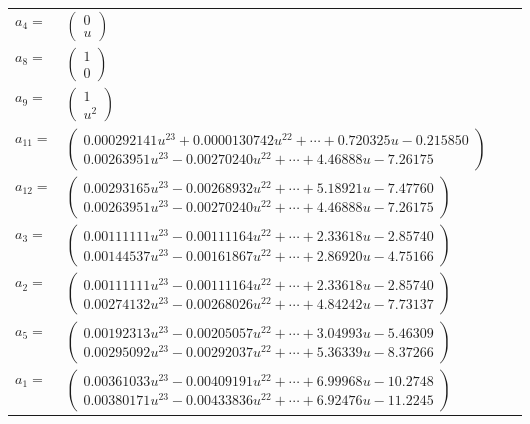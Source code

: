 \documentclass[1p]{elsarticle_modified}
\theoremstyle{definition}
\begin{document}
\begin{tabular}{m{7pt} m{180pt} m{7pt} m{180pt} }
\flushright $a_{4}=$&$\begin{pmatrix}0\\u\end{pmatrix}$ \\
\flushright $a_{8}=$&$\begin{pmatrix}1\\0\end{pmatrix}$ \\
\flushright $a_{9}=$&$\begin{pmatrix}1\\u^2\end{pmatrix}$ \\
\flushright $a_{11}=$&$\begin{pmatrix}0.000292141 u^{23}+0.0000130742 u^{22}+\cdots+0.720325 u-0.215850\\0.00263951 u^{23}-0.00270240 u^{22}+\cdots+4.46888 u-7.26175\end{pmatrix}$ \\
\flushright $a_{12}=$&$\begin{pmatrix}0.00293165 u^{23}-0.00268932 u^{22}+\cdots+5.18921 u-7.47760\\0.00263951 u^{23}-0.00270240 u^{22}+\cdots+4.46888 u-7.26175\end{pmatrix}$ \\
\flushright $a_{3}=$&$\begin{pmatrix}0.00111111 u^{23}-0.00111164 u^{22}+\cdots+2.33618 u-2.85740\\0.00144537 u^{23}-0.00161867 u^{22}+\cdots+2.86920 u-4.75166\end{pmatrix}$ \\
\flushright $a_{2}=$&$\begin{pmatrix}0.00111111 u^{23}-0.00111164 u^{22}+\cdots+2.33618 u-2.85740\\0.00274132 u^{23}-0.00268026 u^{22}+\cdots+4.84242 u-7.73137\end{pmatrix}$ \\
\flushright $a_{5}=$&$\begin{pmatrix}0.00192313 u^{23}-0.00205057 u^{22}+\cdots+3.04993 u-5.46309\\0.00295092 u^{23}-0.00292037 u^{22}+\cdots+5.36339 u-8.37266\end{pmatrix}$ \\
\flushright $a_{1}=$&$\begin{pmatrix}0.00361033 u^{23}-0.00409191 u^{22}+\cdots+6.99968 u-10.2748\\0.00380171 u^{23}-0.00433836 u^{22}+\cdots+6.92476 u-11.2245\end{pmatrix}$ \\

\end{tabular}
\end{document}
